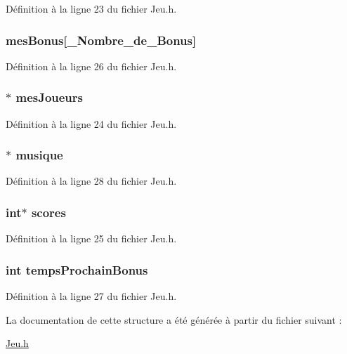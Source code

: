 Définition à la ligne 23 du fichier Jeu.\-h.

\hypertarget{struct_jeu_a9ba9a1f879502d127ed00db670605ac7}{
\subsubsection[{mes\-Bonus}]{ mes\-Bonus\mbox{[}{\bf \-\_\-\-Nombre\-\_\-de\-\_\-\-Bonus}\mbox{]}}}\label{struct_jeu_a9ba9a1f879502d127ed00db670605ac7}


Définition à la ligne 26 du fichier Jeu.\-h.

\hypertarget{struct_jeu_a632589b4fe33211e88d71bab5b8fecb1}{
\subsubsection[{mes\-Joueurs}]{$\ast$ mes\-Joueurs}}\label{struct_jeu_a632589b4fe33211e88d71bab5b8fecb1}


Définition à la ligne 24 du fichier Jeu.\-h.

\hypertarget{struct_jeu_a59b3353d7adab6e96e762c4f8aee2d87}{
\subsubsection[{musique}]{$\ast$ musique}}\label{struct_jeu_a59b3353d7adab6e96e762c4f8aee2d87}


Définition à la ligne 28 du fichier Jeu.\-h.

\hypertarget{struct_jeu_a859dd84beee150c7f6f6e683f1dc91ac}{
\subsubsection[{scores}]{\setlength{\rightskip}{0pt plus 5cm}int$\ast$ scores}}\label{struct_jeu_a859dd84beee150c7f6f6e683f1dc91ac}


Définition à la ligne 25 du fichier Jeu.\-h.

\hypertarget{struct_jeu_a9691871ea592a3579dcc143a4730aa08}{
\subsubsection[{temps\-Prochain\-Bonus}]{\setlength{\rightskip}{0pt plus 5cm}int temps\-Prochain\-Bonus}}\label{struct_jeu_a9691871ea592a3579dcc143a4730aa08}


Définition à la ligne 27 du fichier Jeu.\-h.



La documentation de cette structure a été générée à partir du fichier suivant \-:\begin{DoxyCompactItemize}
\item 
\hyperlink{_jeu_8h}{Jeu.\-h}\end{DoxyCompactItemize}

